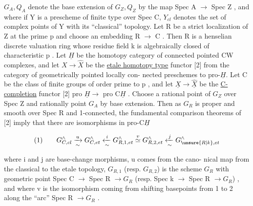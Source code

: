 
$G_A,Q_A$ denote the base extension of $G_Z,Q_Z$ by the map Spec A $\to$
Spec Z , and where if Y is a prescheme of finite type over Spec C,
$Y_{cl}$ denotes the set of complex points of Y with its ``classical''
topology. Let R be a strict localization of Z at the prime p
and choose an embedding R $\to$ C . Then R is a henselian discrete
valuation ring whose residue field k is algebraically closed of
characteristic p . Let $\underline{H}$ be the homotopy category of connected
pointed CW complexes, and let $X \to \hat{X}$ be the \uline{etale homotopy type}
functor [2] from the category of geometrically pointed locally con-%
nected preschemes to pro-$\underline{H}$. Let C be the class of finite groups
of order prime to p , and let $\underline{X} \to \hat{\underline{X}}$ be the \uline{C-completion} functor
[2] pro $\underline{H} \to$ pro C$\underline{H}$ . Choose a rational point of $G_Z$ over Spec Z
and rationally point $G_A$ by base extension. Then as $G_R$ is proper
and smooth over Spec R and 1-connected, the fundamental comparison
theorems of [2] imply that there are isomorphisms in pro-C$\underline{H}$

\[
(1) \qquad G^{\wedge}_{C,cl} \xrightarrow[\sim]{u} G^{\wedge}_{C,et} \xleftarrow[\sim]{i} G^{\wedge}_{R,1,et} \overset{v}{\simeq} G^{\wedge}_{R,2,et} \xleftarrow[\sim]{j} G^{\wedge}_{\unsure{R|k},et}
\]

where i and j are base-change morphisms, u comes from the cano-%
nical map from the classical to the etale topology,  $G_{R,1}$
(resp. $G_{R,2}$) is the scheme $G_R$ with geometric point Spec C $\to$
Spec R $\to G_R$ (resp. Spec k $\to$ Spec R $\to G_R$) , and where v is the
isomorphism coming from shifting basepoints from 1 to 2 along the
``arc'' Spec R $\to G_R$ .

